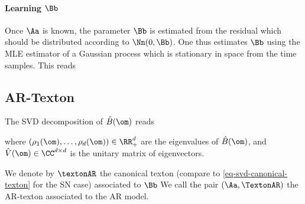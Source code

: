 
\paragraph*{Learning $\Bb$}

Once $\Aa$ is known, the parameter $\Bb$ is estimated from the residual
which should be distributed according to $\Nn(0, \Bb)$. One thus estimates $\Bb$ using the MLE estimator of a Gaussian process which is stationary in space from the time samples. This reads




\subsection{AR-Texton} 

The SVD decomposition of $\hat B(\om)$ reads


where $(\rho_1(\om),\ldots,\rho_d(\om)) \in \RR_+^d$ are the eigenvalues of $\hat B(\om)$, and $\hat V(\om) \in \CC^{d \times d}$ is the unitary matrix of eigenvectors.

We denote by $\textonAR$ the canonical texton (compare to \eqref{eq-svd-canonical-texton} for the SN case) associated to $\Bb$
We call the pair $(\Aa,\TextonAR)$ the AR-texton associated to the AR model.

